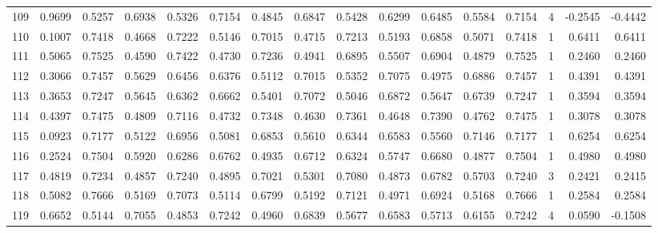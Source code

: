 \begin{tabular}{lrrrrrrrrrrrrrrr}
109 &      0.9699 &  0.5257 &  0.6938 &  0.5326 &  0.7154 &  0.4845 &  0.6847 &  0.5428 &  0.6299 &  0.6485 &   0.5584 &     0.7154 &      4 &                   -0.2545 &                    -0.4442 \\
110 &      0.1007 &  0.7418 &  0.4668 &  0.7222 &  0.5146 &  0.7015 &  0.4715 &  0.7213 &  0.5193 &  0.6858 &   0.5071 &     0.7418 &      1 &                    0.6411 &                     0.6411 \\
111 &      0.5065 &  0.7525 &  0.4590 &  0.7422 &  0.4730 &  0.7236 &  0.4941 &  0.6895 &  0.5507 &  0.6904 &   0.4879 &     0.7525 &      1 &                    0.2460 &                     0.2460 \\
112 &      0.3066 &  0.7457 &  0.5629 &  0.6456 &  0.6376 &  0.5112 &  0.7015 &  0.5352 &  0.7075 &  0.4975 &   0.6886 &     0.7457 &      1 &                    0.4391 &                     0.4391 \\
113 &      0.3653 &  0.7247 &  0.5645 &  0.6362 &  0.6662 &  0.5401 &  0.7072 &  0.5046 &  0.6872 &  0.5647 &   0.6739 &     0.7247 &      1 &                    0.3594 &                     0.3594 \\
114 &      0.4397 &  0.7475 &  0.4809 &  0.7116 &  0.4732 &  0.7348 &  0.4630 &  0.7361 &  0.4648 &  0.7390 &   0.4762 &     0.7475 &      1 &                    0.3078 &                     0.3078 \\
115 &      0.0923 &  0.7177 &  0.5122 &  0.6956 &  0.5081 &  0.6853 &  0.5610 &  0.6344 &  0.6583 &  0.5560 &   0.7146 &     0.7177 &      1 &                    0.6254 &                     0.6254 \\
116 &      0.2524 &  0.7504 &  0.5920 &  0.6286 &  0.6762 &  0.4935 &  0.6712 &  0.6324 &  0.5747 &  0.6680 &   0.4877 &     0.7504 &      1 &                    0.4980 &                     0.4980 \\
117 &      0.4819 &  0.7234 &  0.4857 &  0.7240 &  0.4895 &  0.7021 &  0.5301 &  0.7080 &  0.4873 &  0.6782 &   0.5703 &     0.7240 &      3 &                    0.2421 &                     0.2415 \\
118 &      0.5082 &  0.7666 &  0.5169 &  0.7073 &  0.5114 &  0.6799 &  0.5192 &  0.7121 &  0.4971 &  0.6924 &   0.5168 &     0.7666 &      1 &                    0.2584 &                     0.2584 \\
119 &      0.6652 &  0.5144 &  0.7055 &  0.4853 &  0.7242 &  0.4960 &  0.6839 &  0.5677 &  0.6583 &  0.5713 &   0.6155 &     0.7242 &      4 &                    0.0590 &                    -0.1508 \\

\end{tabular}
